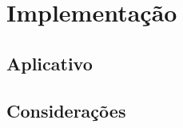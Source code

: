 
\chapter{Implementação}
\label{sec:discussao}


\section{\textbf{Aplicativo}}

\section{\textbf{Considerações}}

\lipsum[3-4] %
